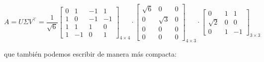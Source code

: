 $A=U\Sigma V^\intercal=\dfrac{1}{\sqrt{6}}\begin{bmatrix}
	0 & 1 & -1 & 1 \\
	1 & 0 & -1 & -1 \\
	1 & 1 & 1 & 0 \\
	1 & -1 & 0 & 1
\end{bmatrix}_{4\times 4}\cdot\begin{bmatrix}
\sqrt{6} & 0 & 0\\
0 & \sqrt{3} & 0\\
0 & 0 & 0\\
0 & 0 & 0
\end{bmatrix}_{4\times 3}\cdot\begin{bmatrix}
0 & 1 & 1\\
\sqrt{2} & 0 & 0\\
0 & 1 & -1
\end{bmatrix}_{3\times3}$

que también podemos escribir de manera más compacta:

